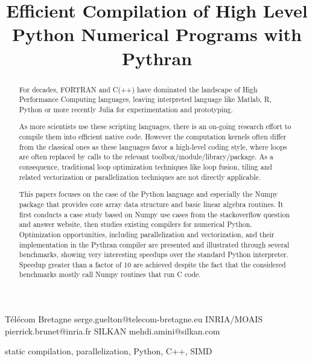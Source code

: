 \documentclass[10pt, preprint]{sigplanconf}
\begin{document}
\title{Efficient Compilation of High Level Python Numerical Programs with Pythran}

           {T{\'e}l{\'e}com Bretagne}
           {serge.guelton@telecom-bretagne.eu}
           {INRIA/MOAIS}
           {pierrick.brunet@inria.fr}
           {SILKAN}
           {mehdi.amini@silkan.com}

\maketitle

\begin{abstract}

    For decades, FORTRAN and C(++) have dominated the landscape of High
    Performance Computing languages, leaving interpreted language like Matlab,
    R, Python or more recently Julia for experimentation and prototyping.

    As more scientists use these scripting languages, there is an on-going
    research effort to compile them into efficient native code. However the
    computation kernels often differ from the classical ones as these languages
    favor a high-level coding style, where loops are often replaced by calls
    to the relevant toolbox/module/library/package. As a consequence, traditional
    loop optimization techniques like loop fusion, tiling and related
    vectorization or parallelization techniques are not directly applicable.

    This papers focuses on the case of the Python language and especially the
    Numpy package that provides core array data structure and basic linear
    algebra routines. It first conducts a case study based on Numpy use
    cases from the stackoverflow question and answer website, then studies
    existing compilers for numerical Python. Optimization opportunities,
    including parallelization and vectorization, and their implementation in
    the Pythran compiler are presented and illustrated through several
    benchmarks, showing very interesting speedups over the standard Python
    interpreter. Speedup greater than a factor of 10 are achieved despite the
    fact that the considered benchmarks mostly call Numpy routines that run C code.

\end{abstract}


\keywords
static compilation, parallelization, Python, C++, SIMD
\end{document}
